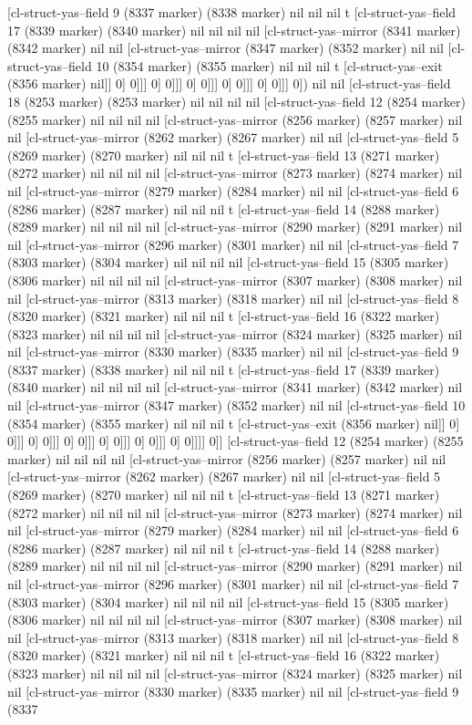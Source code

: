 {{[cl-struct-yas--field 9 (8337 marker) (8338 marker) nil nil nil t [cl-struct-yas--field 17 (8339 marker) (8340 marker) nil nil nil nil [cl-struct-yas--mirror (8341 marker) (8342 marker) nil nil [cl-struct-yas--mirror (8347 marker) (8352 marker) nil nil [cl-struct-yas--field 10 (8354 marker) (8355 marker) nil nil nil t [cl-struct-yas--exit (8356 marker) nil]] 0] 0]]] 0] 0]]] 0] 0]]] 0] 0]]] 0] 0]]] 0]) nil nil [cl-struct-yas--field 18 (8253 marker) (8253 marker) nil nil nil nil [cl-struct-yas--field 12 (8254 marker) (8255 marker) nil nil nil nil [cl-struct-yas--mirror (8256 marker) (8257 marker) nil nil [cl-struct-yas--mirror (8262 marker) (8267 marker) nil nil [cl-struct-yas--field 5 (8269 marker) (8270 marker) nil nil nil t [cl-struct-yas--field 13 (8271 marker) (8272 marker) nil nil nil nil [cl-struct-yas--mirror (8273 marker) (8274 marker) nil nil [cl-struct-yas--mirror (8279 marker) (8284 marker) nil nil [cl-struct-yas--field 6 (8286 marker) (8287 marker) nil nil nil t [cl-struct-yas--field 14 (8288 marker) (8289 marker) nil nil nil nil [cl-struct-yas--mirror (8290 marker) (8291 marker) nil nil [cl-struct-yas--mirror (8296 marker) (8301 marker) nil nil [cl-struct-yas--field 7 (8303 marker) (8304 marker) nil nil nil nil [cl-struct-yas--field 15 (8305 marker) (8306 marker) nil nil nil nil [cl-struct-yas--mirror (8307 marker) (8308 marker) nil nil [cl-struct-yas--mirror (8313 marker) (8318 marker) nil nil [cl-struct-yas--field 8 (8320 marker) (8321 marker) nil nil nil t [cl-struct-yas--field 16 (8322 marker) (8323 marker) nil nil nil nil [cl-struct-yas--mirror (8324 marker) (8325 marker) nil nil [cl-struct-yas--mirror (8330 marker) (8335 marker) nil nil [cl-struct-yas--field 9 (8337 marker) (8338 marker) nil nil nil t [cl-struct-yas--field 17 (8339 marker) (8340 marker) nil nil nil nil [cl-struct-yas--mirror (8341 marker) (8342 marker) nil nil [cl-struct-yas--mirror (8347 marker) (8352 marker) nil nil [cl-struct-yas--field 10 (8354 marker) (8355 marker) nil nil nil t [cl-struct-yas--exit (8356 marker) nil]] 0] 0]]] 0] 0]]] 0] 0]]] 0] 0]]] 0] 0]]] 0] 0]]]] 0]] [cl-struct-yas--field 12 (8254 marker) (8255 marker) nil nil nil nil [cl-struct-yas--mirror (8256 marker) (8257 marker) nil nil [cl-struct-yas--mirror (8262 marker) (8267 marker) nil nil [cl-struct-yas--field 5 (8269 marker) (8270 marker) nil nil nil t [cl-struct-yas--field 13 (8271 marker) (8272 marker) nil nil nil nil [cl-struct-yas--mirror (8273 marker) (8274 marker) nil nil [cl-struct-yas--mirror (8279 marker) (8284 marker) nil nil [cl-struct-yas--field 6 (8286 marker) (8287 marker) nil nil nil t [cl-struct-yas--field 14 (8288 marker) (8289 marker) nil nil nil nil [cl-struct-yas--mirror (8290 marker) (8291 marker) nil nil [cl-struct-yas--mirror (8296 marker) (8301 marker) nil nil [cl-struct-yas--field 7 (8303 marker) (8304 marker) nil nil nil nil [cl-struct-yas--field 15 (8305 marker) (8306 marker) nil nil nil nil [cl-struct-yas--mirror (8307 marker) (8308 marker) nil nil [cl-struct-yas--mirror (8313 marker) (8318 marker) nil nil [cl-struct-yas--field 8 (8320 marker) (8321 marker) nil nil nil t [cl-struct-yas--field 16 (8322 marker) (8323 marker) nil nil nil nil [cl-struct-yas--mirror (8324 marker) (8325 marker) nil nil [cl-struct-yas--mirror (8330 marker) (8335 marker) nil nil [cl-struct-yas--field 9 (8337 }}
